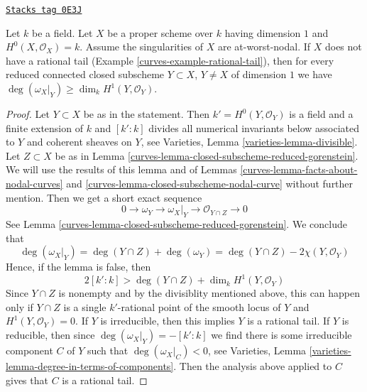\begin{lemma}
\label{curves-lemma-no-rational-tail}
\href{https://stacks.math.columbia.edu/tag/0E3J}{\texttt{Stacks tag 0E3J}}

Let $k$ be a field. Let $X$ be a proper scheme over $k$ having dimension $1$
and $H^0(X, \mathcal{O}_X) = k$. Assume the singularities of $X$ are
at-worst-nodal. If $X$ does not have a rational tail
(Example \ref{curves-example-rational-tail}),
then for every reduced connected closed subscheme
$Y \subset X$, $Y \not = X$ of dimension $1$ we have
$\deg(\omega_X|_Y) \geq \dim_k H^1(Y, \mathcal{O}_Y)$.
\end{lemma}

\begin{proof}

Let $Y \subset X$ be as in the statement. Then $k' = H^0(Y, \mathcal{O}_Y)$
is a field and a finite extension of $k$ and $[k' : k]$
divides all numerical invariants below associated to $Y$ and
coherent sheaves on $Y$, see
Varieties, Lemma \ref{varieties-lemma-divisible}.
Let $Z \subset X$ be as in
Lemma \ref{curves-lemma-closed-subscheme-reduced-gorenstein}.
We will use the results of this lemma and of
Lemmas \ref{curves-lemma-facts-about-nodal-curves} and
\ref{curves-lemma-closed-subscheme-nodal-curve} without further mention.
Then we get a short exact sequence
$$
0 \to \omega_Y \to \omega_X|_Y \to \mathcal{O}_{Y \cap Z} \to 0
$$
See Lemma \ref{curves-lemma-closed-subscheme-reduced-gorenstein}.
We conclude that
$$
\deg(\omega_X|_Y) = \deg(Y \cap Z) + \deg(\omega_Y) =
\deg(Y \cap Z) - 2\chi(Y, \mathcal{O}_Y)
$$
Hence, if the lemma is false, then
$$
2[k' : k] > \deg(Y \cap Z) + \dim_k H^1(Y, \mathcal{O}_Y)
$$
Since $Y \cap Z$ is nonempty and by the divisiblity mentioned above,
this can happen only if $Y \cap Z$ is a single $k'$-rational point
of the smooth locus of $Y$ and $H^1(Y, \mathcal{O}_Y) = 0$.
If $Y$ is irreducible, then this implies $Y$ is a rational tail.
If $Y$ is reducible, then since $\deg(\omega_X|_Y) = -[k' : k]$
we find there is some irreducible component $C$ of $Y$
such that $\deg(\omega_X|_C) < 0$, see
Varieties, Lemma \ref{varieties-lemma-degree-in-terms-of-components}.
Then the analysis above applied
to $C$ gives that $C$ is a rational tail.
\end{proof}

